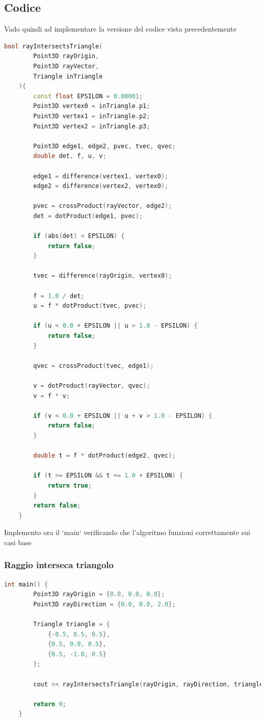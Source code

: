 \documentclass[a4paper]{article}
\begin{document}
\newpage

\subsection{Codice}
Vado quindi ad implementare la versione del codice vista precedentemente

\begin{lstlisting}[language=c++]
    bool rayIntersectsTriangle(
        Point3D rayOrigin, 
        Point3D rayVector,
        Triangle inTriangle
    ){
        const float EPSILON = 0.00001;
        Point3D vertex0 = inTriangle.p1;
        Point3D vertex1 = inTriangle.p2;
        Point3D vertex2 = inTriangle.p3;

        Point3D edge1, edge2, pvec, tvec, qvec;
        double det, f, u, v;

        edge1 = difference(vertex1, vertex0);
        edge2 = difference(vertex2, vertex0);

        pvec = crossProduct(rayVector, edge2);
        det = dotProduct(edge1, pvec);

        if (abs(det) < EPSILON) {
            return false;
        }

        tvec = difference(rayOrigin, vertex0);

        f = 1.0 / det;
        u = f * dotProduct(tvec, pvec);

        if (u < 0.0 + EPSILON || u > 1.0 - EPSILON) {
            return false;
        }

        qvec = crossProduct(tvec, edge1);

        v = dotProduct(rayVector, qvec);
        v = f * v;

        if (v < 0.0 + EPSILON || u + v > 1.0 - EPSILON) {
            return false;
        }

        double t = f * dotProduct(edge2, qvec);

        if (t >= EPSILON && t <= 1.0 + EPSILON) {
            return true;
        }
        return false;
    }
\end{lstlisting}

\newpage

Implemento ora il `main` verificando che l'algoritmo funzioni correttamente sui casi base

\subsubsection{Raggio interseca triangolo}

\begin{lstlisting}[language=c++]
    int main() {
        Point3D rayOrigin = {0.0, 0.0, 0.0};
        Point3D rayDirection = {0.0, 0.0, 2.0};
        
        Triangle triangle = {
            {-0.5, 0.5, 0.5}, 
            {0.5, 0.0, 0.5}, 
            {0.5, -1.0, 0.5}
        };
        
        cout << rayIntersectsTriangle(rayOrigin, rayDirection, triangle);

        return 0;
    }
\end{lstlisting}
\end{document}
